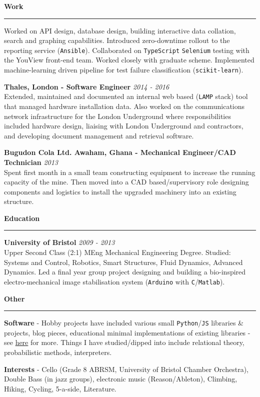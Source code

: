 \documentclass[11pt,a4paper]{article}
\newenvironment{rSection}[1]{
  \smallskip
  {\bf #1}
  \medskip
  \hrule
  \medskip
  \begin{list}{}{
    \setlength{\leftmargin}{1.2em}
  }
  \item[]
}{
  \end{list}
}
\begin{document}
\begin{rSection}{Work}
\par  Worked on API design, database design, building interactive data collation, search and graphing capabilities. Introduced zero-downtime rollout to the reporting service (\texttt{Ansible}). Collaborated on \texttt{TypeScript} \texttt{Selenium} testing with the YouView front-end team. Worked closely with graduate scheme. Implemented machine-learning driven pipeline for test failure classification (\texttt{scikit-learn}).

\smallskip
\par {\bf Thales, London - Software Engineer} \hfill{\em 2014 - 2016}				    
\\ Extended, maintained and documented an internal web based (\texttt{LAMP} stack) tool that managed hardware installation data. Also worked on the communications network infrastructure for the London Underground where responsibilities included hardware design, liaising with London Underground and contractors, and developing document management and retrieval software.

\smallskip
\par {\bf Bugudon Cola Ltd. Awaham, Ghana - Mechanical Engineer/CAD Technician} \hfill{\em 2013}
\\ Spent first month in a small team constructing equipment to increase the running capacity of the mine. Then moved into a CAD based/supervisory role designing components and  logistics to install the upgraded machinery into an existing structure.

\end{rSection}


\begin{rSection}{Education}

{\bf University of Bristol} \hfill{\em 2009 - 2013}
\\ Upper Second Class (2:1) MEng Mechanical Engineering Degree. Studied: Systems and Control, Robotics, Smart Structures, Fluid Dynamics, Advanced Dynamics. Led a final year group project designing and building a bio-inspired electro-mechanical image stabilisation system (\texttt{Arduino} with \texttt{C}/\texttt{Matlab}).

\end{rSection}


\begin{rSection}{Other}

{\bf Software} - Hobby projects have included various small \texttt{Python}/\texttt{JS} libraries \& projects, blog pieces, educational minimal implementations of existing libraries - see \href{https://leontrolski.github.io}{here} for more. Things I have studied/dipped into include relational theory, probabilistic methods, interpreters.
\par {\bf Interests} - Cello (Grade 8 ABRSM, University of Bristol Chamber Orchestra), Double Bass (in jazz groups), electronic music (Reason/Ableton), Climbing, Hiking, Cycling, 5-a-side, Literature.

\end{rSection}
\end{document}
